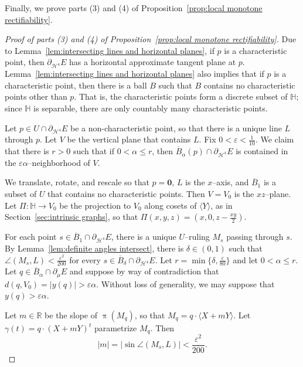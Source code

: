 \documentclass[11pt,reqno]{amsart}
\renewcommand{\H}{\mathbb{H}}
\newcommand{\R}{\mathbb{R}}
\newcommand{\cH}{\mathcal{H}}
\renewcommand{\epsilon}{\varepsilon}
\newcommand{\0}{\mathbf{0}}
\renewcommand{\1}{\mathbf 1}
\newcommand{\from}{\colon}
\renewcommand{\le}{\leqslant}
\theoremstyle{remark}
\begin{document}
Finally, we prove parts (3) and (4) of Proposition~\ref{prop:local monotone rectifiability}.

\begin{proof}[{Proof of parts (3) and (4) of Proposition~\ref{prop:local monotone rectifiability}}]
  Due to Lemma~\ref{lem:intersecting lines and horizontal planes}, if $p$ is a characteristic point, then $\partial_{\cH^4} E$ has a horizontal approximate tangent plane at $p$.  Lemma~\ref{lem:intersecting lines and horizontal planes} also implies that if $p$ is a characteristic point, then there is a ball $B$ such that $B$ contains no characteristic points other than $p$.  That is, the characteristic points form a discrete subset of $\H$; since $\H$ is separable, there are only countably many characteristic points.

  Let $p\in U\cap \partial_{\cH^4} E$ be a non-characteristic point, so that there is a unique line $L$ through $p$.  Let $V$ be the vertical plane that contains $L$. Fix $0<\epsilon<\frac{1}{10}$.  We claim that there is $r>0$ such that if $0<\alpha\le r$, then $\overline{B}_{\alpha}(p)\cap \partial_{\cH^4} E$ is contained in the $\epsilon \alpha$--neighborhood of $V$.

  We translate, rotate, and rescale so that $p=\mathbf{0}$, $L$ is the $x$--axis, and $\overline{B}_1$ is a subset of $U$ that contains no characteristic points.  Then $V=V_0$ is the $xz$--plane.  Let $\Pi\from \H \to V_0$ be the projection to $V_0$ along cosets of $\langle Y\rangle$, as in Section~\ref{sec:intrinsic graphs}, so that $\Pi(x,y,z)=(x,0,z-\frac{xy}{2})$.

  For each point $s\in \overline{B}_{1}\cap \partial_{\cH^4} E$, there is a unique $U$--ruling $M_s$ passing through $s$.  By Lemma~\ref{lem:definite angles intersect}, there is  $\delta\in (0,1)$ such that $\angle(M_s,L)<\frac{\epsilon^2}{200}$ for every $s\in \overline{B}_{\delta}\cap \partial_{\cH^4} E$.  Let $r=\min\{\delta, \frac{\epsilon}{80}\}$ and let $0<\alpha\le r$.  Let $q\in \overline{B}_{\alpha}\cap \partial_\mu E$ and suppose by way of contradiction that $d(q,V_0)=|y(q)|> \epsilon \alpha$.  Without loss of generality, we may suppose that $y(q)>\epsilon \alpha$.

  Let $m\in \R$ be the slope of $\uppi(M_q)$, so that $M_q=q\cdot \langle X+mY\rangle$. Let $\gamma(t)=q\cdot (X+mY)^t$ parametrize $M_q$.  Then
  $$|m|=|\sin \angle(M_s,L)|<\frac{\epsilon^2}{200}.$$


\end{proof}
\end{document}
